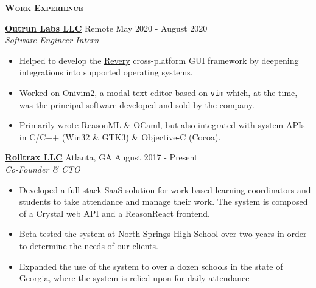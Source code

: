 \documentclass{article}
\newcommand{\sectionHeader}[1]{{\large \textbf{\textsc{#1}}}\hspace{5pt}\xrfill[.5ex]{.4pt}}
\begin{document}
  \vspace{8pt}

  \sectionHeader{Work Experience}

  \href{https://www.outrunlabs.com/}{\textbf{Outrun Labs LLC}} \hspace{3pt} {\footnotesize {}} Remote \hspace*{\fill} {\footnotesize {}} \hspace{1pt} May 2020 - August 2020\\
  {\footnotesize {}} \hspace{1pt} \textit{Software Engineer Intern}
  \begin{itemize}
    \item Helped to develop the \href{https://github.com/revery-ui/revery}{Revery} cross-platform GUI framework by deepening integrations into supported operating systems.
    \item Worked on \href{https://onivim.io/}{Onivim2}, a modal text editor based on \texttt{vim} which, at the time, was the principal software developed and sold by the company.
    \item Primarily wrote ReasonML \& OCaml, but also integrated with system APIs in C/C++ (Win32 \& GTK3) \& Objective-C (Cocoa).
  \end{itemize}

  \vspace{3pt}

  \href{https://rolltrax.com}{\textbf{Rolltrax LLC}} \hspace{3pt} {\footnotesize {}} Atlanta, GA \hspace*{\fill} {\footnotesize {}} \hspace{1pt} August 2017 - Present\\
  {\footnotesize {}} \hspace{1pt} \textit{Co-Founder \& CTO}
  \begin{itemize}
    \item Developed a full-stack SaaS solution for work-based learning coordinators and students to take attendance and manage their work. The system is composed of a Crystal web API and a ReasonReact frontend.
    \item Beta tested the system at North Springs High School over two years in order to determine the needs of our clients.
    \item Expanded the use of the system to over a dozen schools in the state of Georgia, where the system is relied upon for daily attendance
  \end{itemize}
\end{document}
